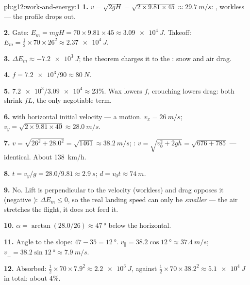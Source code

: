 \begin{solution}{pb:g12:work-and-energy:1}
\textbf{1.} $v = \sqrt{2gH} = \sqrt{2 \times 9.81 \times 45} \approx
\qty{29.7}{m/s}$:  ,  workless --- the
profile drops out.

\textbf{2.} Gate: $E_m = mgH = 70 \times 9.81 \times 45 \approx
\qty{3.09e4}{J}$. Takeoff: $E_m = \tfrac12 \times 70 \times 26^2
\approx \qty{2.37e4}{J}$.

\textbf{3.} $\Delta E_m \approx \qty{-7.2e3}{J}$; the
 theorem charges it to the :
snow  and air drag.

\textbf{4.} $f = \num{7.2e3}/90 \approx \qty{80}{N}$.

\textbf{5.} $\num{7.2e3}/\num{3.09e4} \approx 23\%$. Wax lowers $f$,
crouching lowers drag: both shrink $fL$, the only negotiable term.

\textbf{6.}  with horizontal initial velocity --- a
 motion. $v_x = \qty{26}{m/s}$;
$v_y = \sqrt{2 \times 9.81 \times 40} \approx \qty{28.0}{m/s}$.

\textbf{7.} $v = \sqrt{26^2 + 28.0^2} = \sqrt{1461} \approx
\qty{38.2}{m/s}$; : $v = \sqrt{v_0^2 + 2gh} = \sqrt{676 + 785}$
--- identical. About \qty{138}{km/h}.

\textbf{8.} $t = v_y/g = 28.0/9.81 \approx \qty{2.9}{s}$;
$d = v_0 t \approx \qty{74}{m}$.

\textbf{9.} No. Lift is perpendicular to the velocity (workless) and
drag opposes it (negative ): $\Delta E_m \leq 0$, so the real
landing speed can only be \emph{smaller} --- the air stretches the
flight, it does not feed it.

\textbf{10.} $\alpha = \arctan(28.0/26) \approx \qty{47}{\degree}$
below the horizontal.

\textbf{11.} Angle to the slope: $47 - 35 = \qty{12}{\degree}$.
$v_\parallel = 38.2\cos\qty{12}{\degree} \approx \qty{37.4}{m/s}$;
$v_\perp = 38.2\sin\qty{12}{\degree} \approx \qty{7.9}{m/s}$.

\textbf{12.} Absorbed: $\tfrac12 \times 70 \times 7.9^2 \approx
\qty{2.2e3}{J}$, against $\tfrac12 \times 70 \times 38.2^2 \approx
\qty{5.1e4}{J}$ in total: about $4\%$.


\end{solution}
